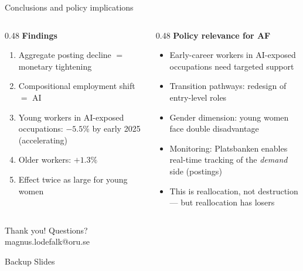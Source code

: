 \documentclass[aspectratio=169,11pt]{beamer}
\begin{document}
\begin{frame}{Conclusions and policy implications}
\begin{columns}[T]
\begin{column}{0.48\textwidth}
\textbf{Findings}
\begin{enumerate}
    \item Aggregate posting decline $=$ monetary tightening
    \item Compositional employment shift $=$ AI
    \item Young workers in AI-exposed occupations: $-5.5\%$ by early 2025 (accelerating)
    \item Older workers: $+1.3\%$
    \item Effect twice as large for young women
\end{enumerate}
\end{column}
\begin{column}{0.48\textwidth}
\textbf{Policy relevance for AF}
\begin{itemize}
    \item Early-career workers in AI-exposed occupations need targeted support
    \item Transition pathways: redesign of entry-level roles
    \item Gender dimension: young women face double disadvantage
    \item Monitoring: Platsbanken enables real-time tracking of the \textit{demand} side (postings)
    \item This is reallocation, not destruction --- but reallocation has losers
\end{itemize}
\end{column}
\end{columns}
\vspace{2mm}
\begin{center}
\large\textcolor{oruBlue}{Thank you! Questions?}\\[1mm]
\scriptsize magnus.lodefalk@oru.se
\end{center}
\end{frame}

\appendix
\begin{frame}[plain]
\begin{center}
\vspace{2cm}
{\Large\textcolor{oruBlue}{Backup Slides}}
\end{center}
\end{frame}
\end{document}
